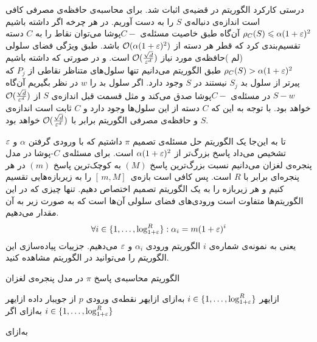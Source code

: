 درستی کارکرد الگوریتم در قضیه‌ی  اثبات شد. برای محاسبه‌ی حافظه‌ی مصرفی کافی است اندازه‌ی دنباله‌ی $S$ را به دست آوریم.
در هر چرخه اگر داشته باشیم
$ \rho_C(S) \leqslant \alpha (1 + \varepsilon) ^ 2 $
آن‌گاه طبق خاصیت مسئله‌ی $C-$پوشا می‌توان نقاط را به $C$ دسته تقسیم‌بندی کرد که قطر هر دسته از 
$\mathcal{O}( \alpha (1 + \varepsilon)^2)$
باشد. طبق ویژگی فضای سلولی (لم 
)حافظه‌ی مورد نیاز 
$\mathcal{O}(\frac{\sqrt{d}}{\varepsilon^d})$
است.
و در صورتی که داشته باشیم
$ \rho_C(S) > \alpha (1 + \varepsilon) ^ 2 $ 
طبق الگوریتم می‌دانیم تنها سلول‌های متناظر نقاطی از $P_j$ که پیرتر از سلول بد $S_j$ نیستند در $S$ وجود دارد. اگر سلول‌ بد را $w$ در نظر بگیریم آن‌گاه $S-w$ در مسئله‌ی $C-$پوشا صدق می‌کند و مثل قسمت قبل اندازه‌ی $S$ از 
$\mathcal{O}(\frac{\sqrt{d}}{\varepsilon^d})$
خواهد بود. با توجه به این که $C$ دسته از این سلول‌ها وجود دارد و $C$ ثابت است اندازه‌ی $S$ و حافظه‌ی مصرفی الگوریتم برابر با
$\mathcal{O}(\frac{\sqrt{d}}{\varepsilon^d})$
خواهد بود.

تا به این‌جا یک الگوریتم حل مسئله‌ی تصمیم $\pi$ داشتیم که با ورودی گرفتن $\alpha$ و $\varepsilon$ تشخیص می‌داد پاسخ بزرگ‌تر از $\alpha (1+\varepsilon)^2$ است. برای مسئله‌ی $C$-پوشا در مدل پنجره‌ی لغزان می‌دانیم نسبت بزرگ‌ترین پاسخ $(M)$ به کوچک‌ترین پاسخ $(m)$ در هر پنجره‌ای برابر با $R$ است. پس کافی است بازه‌ی 
$ [\, m, M]\,$
را به زیربازه‌هایی تقسیم کنیم و هر زیربازه را به یک الگوریتم تصمیم اختصاص دهیم. تنها چیزی که در این الگوریتم‌ها متفاوت است ورودی‌های فضای سلولی آن‌ها است که به صورت زیر به آن مقدار می‌دهیم.
$$ \forall i \in  \{1, \ldots, \log_{1+\varepsilon}^{R} \}: \alpha_i = m  (1+\varepsilon)^i$$
یعنی به نمونه‌ی شماره‌ی $i$  الگوریتم  ورودی $\alpha_i$ و $\varepsilon$ می‌دهیم. جزییات پیاده‌سازی این الگوریتم را می‌توانید در الگوریتم  مشاهده کنید.

\caption
{الگوریتم محاسبه‌ی پاسخ $\pi$ در مدل پنجره‌ی لغزان}
‌ازای{هر $ i \in  \{1, \ldots, \log_{1+\varepsilon}^{R} \}$ }
‌به‌ازای{}
‌ازای{هر نقطه‌ی ورودی $p$ از جویبار داده}
‌ازای{هر$ i \in  \{1, \ldots, \log_{1+\varepsilon}^{R} \}$ }
‌به‌ازای{}
‌اگر{}

‌به‌ازای{}

